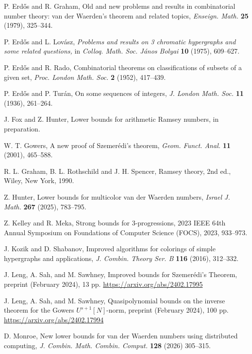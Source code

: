 \documentclass[11pt]{article}
\numberwithin{equation}{section}
\theoremstyle{definition}
\theoremstyle{remark}
\begin{document}
\begin{thebibliography}{}
 P. Erd\H{o}s and R. Graham, Old and new problems and results in combinatorial number theory: van der Waerden's theorem and related topics, {\it Enseign. Math.} {\bf 25} (1979), 325--344.

 P. Erd\H{o}s and L. Lov\'asz, \textit{Problems and results on 3 chromatic hypergraphs and some related questions,} in \textit{Colloq. Math. Soc. J\'anos Bolyai} \textbf{10} (1975), 609--627.

 P. Erd\H{o}s and R. Rado, Combinatorial theorems on classifications of subsets of a given set, 
{\it Proc. London Math. Soc.} {\bf 2} (1952), 417--439.

 P. Erd\H{o}s and P. Tur\'an, On some sequences of integers, {\it J. London Math. Soc.} {\bf 11} (1936), 261--264.

 J. Fox and Z. Hunter, Lower bounds for arithmetic Ramsey numbers, in preparation. 

 W. T. Gowers, A new proof of Szemer\'edi's theorem, {\it Geom. Funct. Anal.} {\bf 11} (2001), 465--588.

 R. L. Graham, B. L. Rothschild and J. H. Spencer, Ramsey theory, 2nd ed., Wiley, New York, 1990. 

 Z. Hunter, Lower bounds for multicolor van der Waerden numbers, {\it 
Israel J. Math.} {\bf 267} (2025), 783--795.

 Z. Kelley and R. Meka, 
Strong bounds for 3-progressions, 2023 IEEE 64th Annual Symposium on Foundations of Computer Science (FOCS), 2023, 933--973.


 J. Kozik and D. Shabanov, Improved algorithms for colorings of simple hypergraphs and applications, 
{\it J. Combin. Theory Ser. B} {\bf 116} (2016), 312--332.

 J. Leng, A. Sah, and M. Sawhney, Improved bounds for Szemer\'edi's Theorem, preprint (February 2024), 13 pp. \url{https://arxiv.org/abs/2402.17995}

 J. Leng, A. Sah, and M. Sawhney, Quasipolynomial bounds on the inverse theorem for the Gowers $U^{s+1}[N]$-norm, preprint (February 2024), 100 pp. \url{https://arxiv.org/abs/2402.17994}


 D. Monroe, New lower bounds for van der Waerden numbers using distributed computing, {\it J. Combin. Math. Combin. Comput.} {\bf 128} (2026) 305--315. 





\end{thebibliography}
\end{document}
